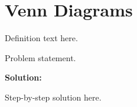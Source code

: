 \section{Venn Diagrams}


\begin{definition}[Term]
Definition text here.
\end{definition}

\begin{example}
Problem statement.

\textbf{Solution:}

Step-by-step solution here.
\end{example}
